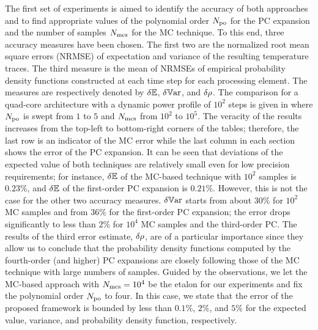 
The first set of experiments is aimed to identify the accuracy of both approaches and to find appropriate values of the polynomial order ${N_\text{po}}$ for the PC expansion and the number of samples $N_\text{mcs}$ for the MC technique. To this end, three accuracy measures have been chosen. The first two are the normalized root mean square errors (NRMSE) of expectation and variance of the resulting temperature traces. The third measure is the mean of NRMSEs of empirical probability density functions constructed at each time step for each processing element. The measures are respectively denoted by $\delta\mathbb{E}$, $\delta\mathbb{V}\text{ar}$, and $\delta\rho$. The comparison for a quad-core architecture with a dynamic power profile of $10^2$ steps is given in  where ${N_\text{po}}$ is swept from $1$ to $5$ and $N_\text{mcs}$ from $10^2$ to $10^5$. The veracity of the results increases from the top-left to bottom-right corners of the tables; therefore, the last row is an indicator of the MC error while the last column in each section shows the error of the PC expansion. It can be seen that deviations of the expected value of both techniques are relatively small even for low precision requirements; for instance, $\delta\mathbb{E}$ of the MC-based technique with $10^2$ samples is $0.23\%$, and $\delta\mathbb{E}$ of the first-order PC expansion is $0.21\%$. However, this is not the case for the other two accuracy measures. $\delta\mathbb{V}\text{ar}$ starts from about $30\%$ for $10^2$ MC samples and from $36\%$ for the first-order PC expansion; the error drops significantly to less than $2\%$ for $10^4$ MC samples and the third-order PC. The results of the third error estimate, $\delta\rho$, are of a particular importance since they allow us to conclude that the probability density functions computed by the fourth-order (and higher) PC expansions are closely following those of the MC technique with large numbers of samples. Guided by the observations, we let the MC-based approach with $N_\text{mcs} = 10^4$ be the etalon for our experiments and fix the polynomial order ${N_\text{po}}$ to four. In this case, we state that the error of the proposed framework is bounded by less than $0.1\%$, $2\%$, and $5\%$ for the expected value, variance, and probability density function, respectively.

